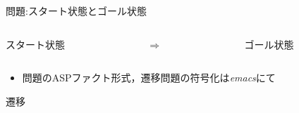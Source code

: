 \begin{frame}{問題:スタート状態とゴール状態}
  \begin{columns}
    \begin{column}{0.45\textwidth}\centering
      \begin{exampleblock}{スタート状態}
	\centering
	\scalebox{0.55}{}
      \end{exampleblock}
    \end{column}
    \begin{column}{0.05\textwidth}\centering
      $\Rightarrow$
    \end{column}
    \begin{column}{0.45\textwidth}\centering
      \begin{exampleblock}{ゴール状態}
        \centering
        \scalebox{0.55}{}
      \end{exampleblock}
    \end{column}
  \end{columns}\vfill
\begin{itemize}
 \item 問題のASPファクト形式，遷移問題の符号化は\textit{emacs}にて 
\end{itemize}
\end{frame}
\begin{frame}{遷移}
\begin{itemize}
\end{itemize}\vfill
 \begin{exampleblock}{}
\centering

\end{exampleblock}
\end{frame}



